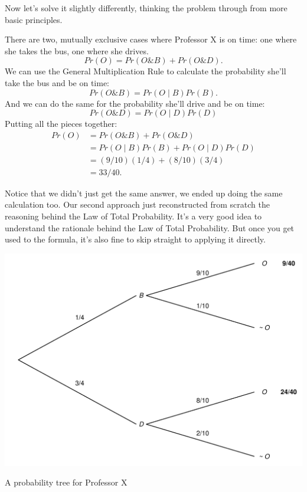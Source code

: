 \documentclass[justified]{tufte-book}
\newcommand{\given}{\mid}
\renewcommand{\wedge}{\mathbin{\&}}
\newcommand{\p}{Pr}
\theoremstyle{definition}
\theoremstyle{definition}
\theoremstyle{definition}
\theoremstyle{remark}
\begin{document}
Now let's solve it slightly differently, thinking the problem through
from more basic principles.

There are two, mutually exclusive cases where Professor X is on time:
one where she takes the bus, one where she drives.
\[ \p(O) = \p(O \wedge B) + \p(O \wedge D). \] We can use the General
Multiplication Rule to calculate the probability she'll take the bus and
be on time: \[ \p(O \wedge B) = \p(O \given B)\p(B). \] And we can do
the same for the probability she'll drive and be on time:
\[ \p(O \wedge D) = \p(O \given D)\p(D)\] Putting all the pieces
together: \[
  \begin{aligned}
    \p(O) &= \p(O \wedge B) + \p(O \wedge D)\\
          &= \p(O \given B)\p(B) + \p(O \given D)\p(D)\\
          &= (9/10)(1/4) + (8/10)(3/4)\\
          &= 33/40.
  \end{aligned}
\]

Notice that we didn't just get the same answer, we ended up doing the
same calculation too. Our second approach just reconstructed from
scratch the reasoning behind the Law of Total Probability. It's a very
good idea to understand the rationale behind the Law of Total
Probability. But once you get used to the formula, it's also fine to
skip straight to applying it directly.

\begin{marginfigure}
\includegraphics{_main_files/figure-latex/unnamed-chunk-74-5} \caption[A probability tree for Professor X]{A probability tree for Professor X}\label{fig:unnamed-chunk-74}
\end{marginfigure}
\end{document}
